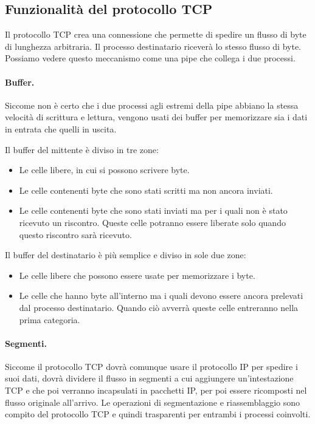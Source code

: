     \subsection{Funzionalità del protocollo TCP}
        Il protocollo TCP crea una connessione che permette di spedire un flusso di byte di lunghezza arbitraria. Il processo destinatario riceverà lo stesso flusso di byte. Possiamo vedere questo meccanismo come una pipe che collega i due processi.
        
        \paragraph{Buffer.} Siccome non è certo che i due processi agli estremi della pipe abbiano la stessa velocità di scrittura e lettura, vengono usati dei buffer per memorizzare sia i dati in entrata che quelli in uscita.
        
        Il buffer del mittente è diviso in tre zone:
        \begin{itemize}
            \item Le celle libere, in cui si possono scrivere byte.
            
            \item Le celle contenenti byte che sono stati scritti ma non ancora inviati.
            
            \item Le celle contenenti byte che sono stati inviati ma per i quali non è stato ricevuto un riscontro. Queste celle potranno essere liberate solo quando questo riscontro sarà ricevuto.
        \end{itemize}
        
        Il buffer del destinatario è più semplice e diviso in sole due zone:
        \begin{itemize}
            \item Le celle libere che possono essere usate per memorizzare i byte.
            
            \item Le celle che hanno byte all'interno ma i quali devono essere ancora prelevati dal processo destinatario. Quando ciò avverrà queste celle entreranno nella prima categoria.
        \end{itemize}
        
        \paragraph{Segmenti.} Siccome il protocollo TCP dovrà comunque usare il protocollo IP per spedire i suoi dati, dovrà dividere il flusso in segmenti a cui aggiungere un'intestazione TCP e che poi verranno incapsulati in pacchetti IP, per poi essere ricomposti nel flusso originale all'arrivo. Le operazioni di segmentazione e riassemblaggio sono compito del protocollo TCP e quindi trasparenti per entrambi i processi coinvolti.
        
